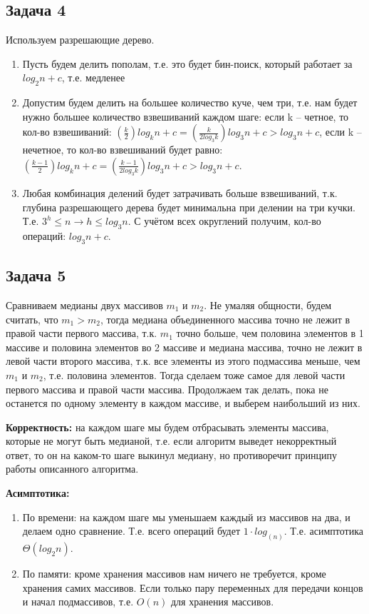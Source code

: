 \documentclass[a4paper,14pt]{article} %
\begin{document}
\subsection{Задача 4}
Используем разрешающие дерево. 
\begin{enumerate}
	\item Пусть будем делить пополам, т.е. это будет бин-поиск, который работает за $log_2n + c$, т.е. медленее
	\item Допустим будем делить на большее количество куче, чем три, т.е. нам будет нужно большее количество взвешиваний каждом шаге:
	если k -- четное, то кол-во взвешиваний: $(\frac{k}{2})log_kn + c = (\frac{k}{2log_3k})log_3n + c > log_3n + c$, если k -- нечетное, 
	то кол-во взвешиваний будет равно: $(\frac{k-1}{2})log_kn + c = (\frac{k-1}{2log_3k})log_3n + c > log_3n + c$.
	\item Любая комбинация делений будет затрачивать больше взвешиваний, т.к. глубина разрешающего дерева будет минимальна при делении на три кучки. 
	Т.е. $3^h \leq n \rightarrow h \leq log_3n$. С учётом всех округлений получим, кол-во операций: $log_3n + c$.
\end{enumerate}

\subsection{Задача 5}
Сравниваем медианы двух массивов $m_1$ и $m_2$. Не умаляя общности, будем считать, что $m_1 > m_2$, тогда медиана объединенного массива точно не лежит в правой части первого массива, 
т.к. $m_1$ точно больше, чем половина элементов в 1 массиве и половина элементов во 2 массиве и медиана массива, точно не лежит в левой части второго массива, т.к. все элементы из этого подмассива меньше, чем $m_1$ и $m_2$, т.е. половина элементов.
Тогда сделаем тоже самое для левой части первого массива и правой части массива. Продолжаем так делать, пока не останется по одному элементу в каждом массиве, и выберем наибольший из них.

\textbf{Корректность: } на каждом шаге мы будем отбрасывать элементы массива, которые не могут быть медианой, т.е. если алгоритм выведет некорректный ответ, то
он на каком-то шаге выкинул медиану, но противоречит принципу работы описанного алгоритма. 

\textbf{Асимптотика:} 
\begin{enumerate}
	\item По времени: на каждом шаге мы уменьшаем каждый из массивов на два, и делаем одно сравнение. Т.е. всего операций будет $1 \cdot log_(n)$. Т.е. асимптотика $\Theta(log_2n)$.
	\item По памяти: кроме хранения массивов нам ничего не требуется, кроме хранения самих массивов. Если только пару переменных для передачи концов и начал подмассивов, т.е. $O(n)$ для хранения массивов.
\end{enumerate}
\end{document}
